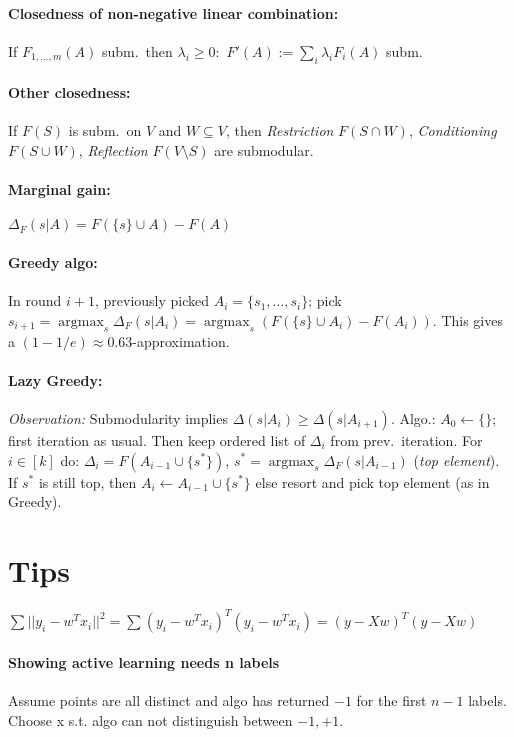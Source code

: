 \documentclass[11pt]{scrartcl}
\DeclareMathOperator{\argmax}{argmax}
\begin{document}
\begin{multicols}{3}
\paragraph{Closedness of non-negative linear combination:}
If $F_{1,\dots,m}(A)$ subm.\ then $\lambda_i \geq 0:$ $F'(A) := \sum_i \lambda_i F_i(A)$ subm.

\paragraph{Other closedness:}
If $F(S)$ is subm.\ on $V$ and $W\subseteq V$, then
\emph{Restriction} $F(S \cap W)$,
\emph{Conditioning} $F(S \cup W)$,
\emph{Reflection} $F(V \setminus S)$ are submodular.

\paragraph{Marginal gain:}
$\Delta_F(s|A)=F(\{s\} \cup A)-F(A)$

\paragraph{Greedy algo:}
In round $i+1$, previously picked $A_i=\{s_1,\dots,s_i\}$; pick $s_{i+1} = \argmax_{s} \Delta_F(s|A_i) = \argmax_{s} (F(\{s\}\cup A_i)-F(A_i))$.
This gives a $(1-1/e) \approx 0.63$-approximation.

\paragraph{Lazy Greedy:}
\emph{Observation:} Submodularity implies $\Delta(s|A_i) \geq \Delta(s|A_{i+1})$.
Algo.: $A_0 \leftarrow \{\}$; first iteration as usual.
Then keep ordered list of $\Delta_i$ from prev.\ iteration.
For $i \in [k]$ do: $\Delta_i=F(A_{i-1}\cup \{s^*\})$, $s^*=\argmax_s\Delta_F(s|A_{i-1})$ (\emph{top element}).
If $s^*$ is still top, then $A_i \leftarrow A_{i-1}\cup \{s^*\}$ else resort and pick top element (as in Greedy). 


\section{Tips}

$\sum{||y_i - w^Tx_i||^2} = \sum{(y_i - w^Tx_i)^T(y_i - w^Tx_i)} = (y - Xw)^T(y-Xw)$

\paragraph{Showing active learning needs n labels} Assume points are all distinct and algo has returned $-1$ for the first $n-1$ labels. Choose x s.t. algo can not distinguish between $-1,+1$.


\end{multicols}
\end{document}
